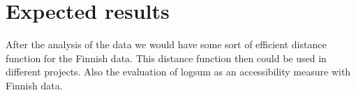 \section{Expected results}

After the analysis of the data we would have some sort of efficient distance function for the Finnish data. This distance function then could be used in different projects. Also the evaluation of logsum as an accessibility measure with Finnish data.  \\